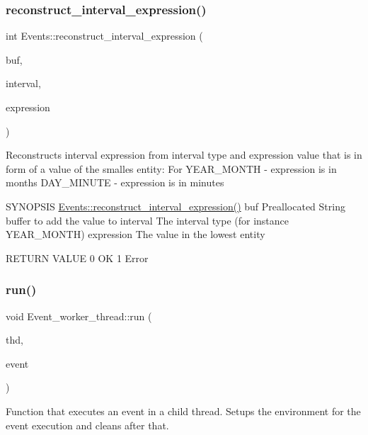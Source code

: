 \subsubsection{\texorpdfstring{reconstruct\+\_\+interval\+\_\+expression()}{reconstruct\_interval\_expression()}}
{\footnotesize\ttfamily int Events\+::reconstruct\+\_\+interval\+\_\+expression (\begin{DoxyParamCaption}\item[{String $\ast$}]{buf,  }\item[{interval\+\_\+type}]{interval,  }\item[{longlong}]{expression }\end{DoxyParamCaption})\hspace{0.3cm}{\ttfamily [static]}}

Reconstructs interval expression from interval type and expression value that is in form of a value of the smalles entity\+: For Y\+E\+A\+R\+\_\+\+M\+O\+N\+TH -\/ expression is in months D\+A\+Y\+\_\+\+M\+I\+N\+U\+TE -\/ expression is in minutes

S\+Y\+N\+O\+P\+S\+IS \mbox{\hyperlink{group__Event__Scheduler_gafb6d2b26338cb92f01504ba32e0ecdf7}{Events\+::reconstruct\+\_\+interval\+\_\+expression()}} buf Preallocated String buffer to add the value to interval The interval type (for instance Y\+E\+A\+R\+\_\+\+M\+O\+N\+TH) expression The value in the lowest entity

R\+E\+T\+U\+RN V\+A\+L\+UE 0 OK 1 Error \mbox{\label{group__Event__Scheduler_ga3226ac4e79d64e27ce9eebed2234d2c1}} 
\subsubsection{\texorpdfstring{run()}{run()}}
{\footnotesize\ttfamily void Event\+\_\+worker\+\_\+thread\+::run (\begin{DoxyParamCaption}\item[{T\+HD $\ast$}]{thd,  }\item[{\mbox{\hyperlink{classEvent__queue__element__for__exec}{Event\+\_\+queue\+\_\+element\+\_\+for\+\_\+exec}} $\ast$}]{event }\end{DoxyParamCaption})}

Function that executes an event in a child thread. Setups the environment for the event execution and cleans after that.

